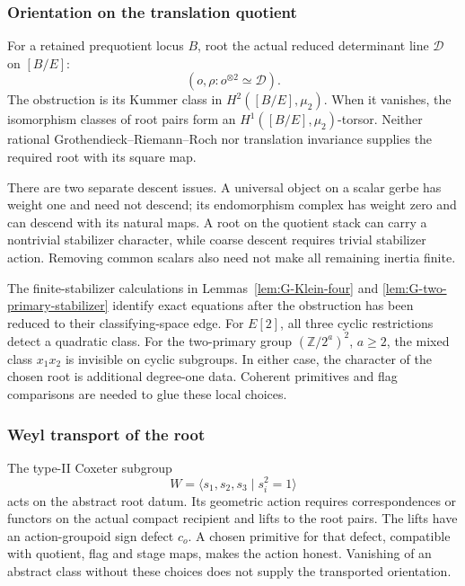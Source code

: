 \subsubsection{Orientation on the translation quotient}
\label{subsubsec:obstruction-O1}

For a retained prequotient locus \(B\), root the actual reduced
determinant line \(\mathscr D\) on \([B/E]\):
\[
 (o,\rho:o^{\otimes2}\simeq\mathscr D).
\]
The obstruction is its Kummer class in \(H^2([B/E],\mu_2)\).
When it vanishes, the isomorphism classes of root pairs form an
\(H^1([B/E],\mu_2)\)-torsor. Neither rational
Grothendieck--Riemann--Roch nor translation invariance supplies
the required root with its square map.

There are two separate descent issues. A universal object on a
scalar gerbe has weight one and need not descend; its endomorphism
complex has weight zero and can descend with its natural maps.
A root on the quotient stack can carry a nontrivial stabilizer
character, while coarse descent requires trivial stabilizer action.
Removing common scalars also need not make all remaining inertia
finite.

The finite-stabilizer calculations in
Lemmas~\ref{lem:G-Klein-four} and
\ref{lem:G-two-primary-stabilizer} identify exact equations after
the obstruction has been reduced to their classifying-space edge.
For \(E[2]\), all three cyclic restrictions detect a quadratic
class. For the two-primary group \((\mathbb Z/2^a)^2\),
\(a\ge2\), the mixed class \(x_1x_2\) is invisible on cyclic
subgroups. In either case, the character of the chosen root is
additional degree-one data. Coherent primitives and flag
comparisons are needed to glue these local choices.

\subsubsection{Weyl transport of the root}
\label{subsubsec:obstruction-O1plus}

The type-II Coxeter subgroup
\[
 W=\langle s_1,s_2,s_3\mid s_i^2=1\rangle
\]
acts on the abstract root datum. Its geometric action requires
correspondences or functors on the actual compact recipient and
lifts to the root pairs. The lifts have an action-groupoid sign
defect \(c_o\). A chosen primitive for that defect, compatible
with quotient, flag and stage maps, makes the action honest.
Vanishing of an abstract class without these choices does not
supply the transported orientation.

